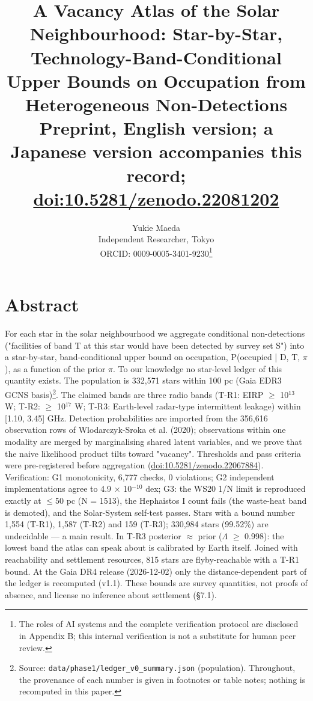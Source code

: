 \documentclass[11pt]{article}
\title{A Vacancy Atlas of the Solar Neighbourhood: Star-by-Star, Technology-Band-Conditional Upper Bounds on Occupation from Heterogeneous Non-Detections \\[1ex] {\large Preprint, English version; a Japanese version accompanies this record; \url{doi:10.5281/zenodo.22081202}}}
\author{Yukie Maeda \\ Independent Researcher, Tokyo \\ ORCID: 0009-0005-3401-9230\thanks{The roles of AI systems and the complete verification protocol are disclosed in Appendix B; this internal verification is not a substitute for human peer review.}}
\date{}
\begin{document}
\maketitle

\section*{Abstract}

\noindent For each star in the solar neighbourhood we aggregate conditional non-detections ("facilities of band T at this star would have been detected by survey set S") into a star-by-star, band-conditional upper bound on occupation, P(occupied | D, T, \(\pi\)), as a function of the prior \(\pi\). To our knowledge no star-level ledger of this quantity exists. The population is 332,571 stars within 100 pc (Gaia EDR3 GCNS basis)\footnote{Source: \texttt{data/phase1/ledger\_v0\_summary.json} (population). Throughout, the provenance of each number is given in footnotes or table notes; nothing is recomputed in this paper.}. The claimed bands are three radio bands (T-R1: EIRP \(\geq\) 10\(^{13}\) W; T-R2: \(\geq\) 10\(^{17}\) W; T-R3: Earth-level radar-type intermittent leakage) within [1.10, 3.45] GHz. Detection probabilities are imported from the 356,616 observation rows of Wlodarczyk-Sroka et al. (2020); observations within one modality are merged by marginalising shared latent variables, and we prove that the naive likelihood product tilts toward "vacancy". Thresholds and pass criteria were pre-registered before aggregation (\url{doi:10.5281/zenodo.22067884}). Verification: G1 monotonicity, 6,777 checks, 0 violations; G2 independent implementations agree to 4.9 \(\times\) 10\(^{-10}\) dex; G3: the WS20 1/N limit is reproduced exactly at \(\leq\)50 pc (N = 1513), the Hephaistos I count fails (the waste-heat band is demoted), and the Solar-System self-test passes. Stars with a bound number 1,554 (T-R1), 1,587 (T-R2) and 159 (T-R3); 330,984 stars (99.52\%) are undecidable --- a main result. In T-R3 posterior \(\approx\) prior (\(\Lambda\) \(\geq\) 0.998): the lowest band the atlas can speak about is calibrated by Earth itself. Joined with reachability and settlement resources, 815 stars are flyby-reachable with a T-R1 bound. At the Gaia DR4 release (2026-12-02) only the distance-dependent part of the ledger is recomputed (v1.1). These bounds are survey quantities, not proofs of absence, and license no inference about settlement (\S{}7.1).\par\smallskip
\end{document}
